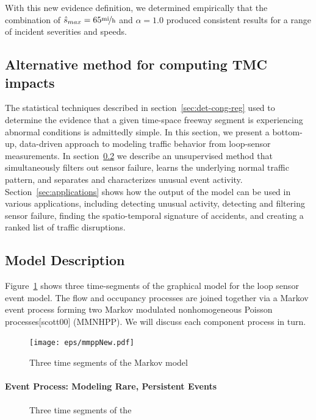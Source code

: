 \documentclass[12pt]{report}
\newcounter{time}
\newcounter{space}
\begin{document}
With this new evidence definition, we determined empirically that the
combination of $\hat{s}_{max}=65\unitfrac{mi}{h}$ and $\alpha=1.0$
produced consistent results for a range of incident severities and
speeds.


\subsection{Alternative method for computing TMC impacts}
\label{sec:alt-tmc-meth}

The statistical techniques described in section~\ref{sec:det-cong-reg}
used to determine the evidence that a given time-space freeway segment
is experiencing abnormal conditions is admittedly simple.  In this
section, we present a bottom-up, data-driven approach to modeling
traffic behavior from loop-sensor measurements.  In
section~\ref{sec:model} we describe an unsupervised method that
simultaneously filters out sensor failure, learns the underlying
normal traffic pattern, and separates and characterizes unusual event
activity.  Section~\ref{sec:applications} shows how the output of the
model can be used in various applications, including detecting unusual
activity, detecting and filtering sensor failure, finding the
spatio-temporal signature of accidents, and creating a ranked list of
traffic
disruptions.  %

\subsection{Model Description}\label{sec:model}
Figure~\ref{fig:model} shows three time-segments of the graphical
model for the loop sensor event model. The flow and occupancy
processes are joined together via a Markov event process forming two
Markov modulated nonhomogeneous Poisson processes[scott00] (MMNHPP).
We will discuss each component process in turn.
\begin{figure}
  \centering
  \texttt{[image: eps/mmppNew.pdf]}
  \caption{Three time segments of the Markov model }\label{fig:model}
\end{figure}




\paragraph{Event Process: Modeling Rare, Persistent Events}\label{sec:event}
\begin{figure}
  \centering
  \caption{Three time segments of the }\label{fig:eventGM}
\end{figure}
\end{document}
